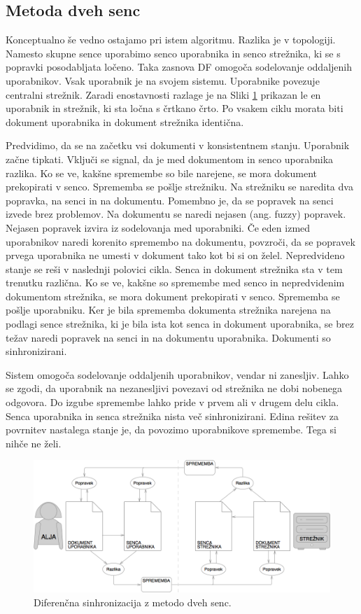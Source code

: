 \documentclass[a4paper, 12pt, twoside]{book}
\begin{document}
\subsection{Metoda dveh senc}

Konceptualno še vedno ostajamo pri istem algoritmu. Razlika je v topologiji. Namesto skupne sence uporabimo senco uporabnika in senco strežnika, ki se s popravki posodabljata ločeno. Taka zasnova DF omogoča sodelovanje oddaljenih uporabnikov. Vsak uporabnik je na svojem sistemu. Uporabnike povezuje centralni strežnik. Zaradi enostavnosti razlage je na Sliki \ref{ds2} prikazan le en uporabnik in strežnik, ki sta ločna s črtkano črto. Po vsakem ciklu morata biti dokument uporabnika in dokument strežnika identična.

Predvidimo, da se na začetku vsi dokumenti v konsistentnem stanju. Uporabnik začne tipkati. Vključi se signal, da je med dokumentom in senco uporabnika razlika. Ko se ve, kakšne spremembe so bile narejene, se mora dokument prekopirati v senco. Sprememba se pošlje strežniku. Na strežniku se naredita dva popravka, na senci in na dokumentu. Pomembno je, da se popravek na senci izvede brez problemov. Na dokumentu se naredi nejasen (ang. fuzzy) popravek. Nejasen popravek izvira iz sodelovanja med uporabniki. Če eden izmed uporabnikov naredi korenito spremembo na dokumentu, povzroči, da se popravek prvega uporabnika ne umesti v dokument tako kot bi si on želel. Nepredvideno stanje se reši v naslednji polovici cikla. Senca in dokument strežnika sta v tem trenutku različna. Ko se ve, kakšne so spremembe med senco in nepredvidenim dokumentom strežnika, se mora dokument prekopirati v senco. Sprememba se pošlje uporabniku. Ker je bila sprememba dokumenta strežnika narejena na podlagi sence strežnika, ki je bila ista kot senca in dokument uporabnika, se brez težav naredi popravek na senci in na dokumentu uporabnika. Dokumenti so sinhronizirani.

Sistem omogoča sodelovanje oddaljenih uporabnikov, vendar ni zanesljiv. Lahko se zgodi, da uporabnik na nezanesljivi povezavi od strežnika ne dobi nobenega odgovora. Do izgube spremembe lahko pride v prvem ali v drugem delu cikla. Senca uporabnika in senca strežnika nista več sinhronizirani. Edina rešitev za povrnitev nastalega stanje je, da povozimo uporabnikove spremembe. Tega si nihče ne želi.

\begin{figure}[placement h]
\begin{center}
\includegraphics[width=11.83cm]{ds2.png}
\end{center}
\caption{Diferenčna sinhronizacija z metodo dveh senc.}
\label{ds2}
\end{figure}
\end{document}
